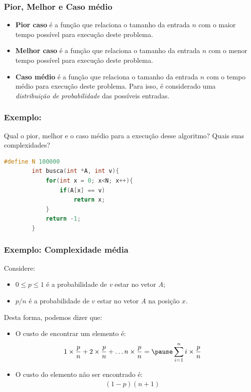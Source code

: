 \documentclass[10pt]{beamer}
\begin{document}
\begin{frame}[t]
    \frametitle{Pior, Melhor e Caso médio}
    \begin{itemize}
        \item \textbf{Pior caso} é a função que relaciona o tamanho da entrada $n$ com o maior tempo possível para execução deste problema.
        \item \textbf{Melhor caso} é a função que relaciona o tamanho da entrada $n$ com o menor tempo possível para execução deste problema.
        \item \textbf{Caso médio} é a função que relaciona o tamanho da entrada $n$ com o tempo médio para execução deste problema. Para isso, é considerado uma \emph{distribuição de probabilidade} das possíveis entradas.
    \end{itemize}

\end{frame}

\begin{frame}[fragile, t]
    \frametitle{Exemplo: }
    Qual o pior, melhor e o caso médio para a execução desse algoritmo? Quais suas complexidades?

    \begin{lstlisting}[language=C++, basicstyle=\small]
        #define N 100000
        int busca(int *A, int v){
            for(int x = 0; x<N; x++){
                if(A[x] == v)
                    return x;
            }
            return -1;
        }
    \end{lstlisting}
\end{frame}

\begin{frame}
    \frametitle{Exemplo: Complexidade média}
    Considere:
    \begin{itemize}
        \item $0\leq p\leq 1$ é a probabilidade de \emph{v} estar no vetor \emph{A};
        \item $p/n$ é a probabilidade de $v$ estar no vetor \emph{A} na posição $x$.
    \end{itemize}

    \pause Desta forma, podemos dizer que:
    \begin{itemize}
        \item O custo de encontrar um elemento é:
              \begin{align}\label{Eq1}
                  1\times \frac{p}{n} + 2\times \frac{p}{n} +\ldots n\times \frac{p}{n}= \pause \sum_{i=1}^n i\times \frac{p}{n}
              \end{align}
        \item O custo do elemento não ser encontrado é:
              \begin{align}\label{Eq2}
                  (1-p) (n+1)
              \end{align}
    \end{itemize}
\end{frame}
\end{document}

